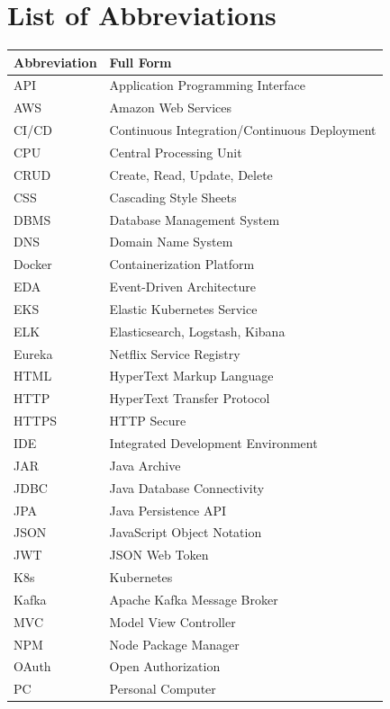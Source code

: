 \chapter*{List of Abbreviations}

\begin{table}[h]
\centering
\renewcommand{\arraystretch}{1.3}
\begin{tabular}{ll}
\toprule
\textbf{Abbreviation} & \textbf{Full Form} \\
\midrule
API & Application Programming Interface \\
AWS & Amazon Web Services \\
CI/CD & Continuous Integration/Continuous Deployment \\
CPU & Central Processing Unit \\
CRUD & Create, Read, Update, Delete \\
CSS & Cascading Style Sheets \\
DBMS & Database Management System \\
DNS & Domain Name System \\
Docker & Containerization Platform \\
EDA & Event-Driven Architecture \\
EKS & Elastic Kubernetes Service \\
ELK & Elasticsearch, Logstash, Kibana \\
Eureka & Netflix Service Registry \\
HTML & HyperText Markup Language \\
HTTP & HyperText Transfer Protocol \\
HTTPS & HTTP Secure \\
IDE & Integrated Development Environment \\
JAR & Java Archive \\
JDBC & Java Database Connectivity \\
JPA & Java Persistence API \\
JSON & JavaScript Object Notation \\
JWT & JSON Web Token \\
K8s & Kubernetes \\
Kafka & Apache Kafka Message Broker \\
MVC & Model View Controller \\
NPM & Node Package Manager \\
OAuth & Open Authorization \\
PC & Personal Computer \\

\end{tabular}
\end{table}
